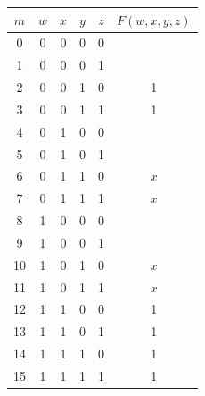 \begin{center}
\begin{tabular}{c|cccc|c}
\rowcolor[HTML]{FFCCC9} 
\cellcolor[HTML]{9AFF99}$m$ & $w$ & $x$ & $y$ & $z$ & \cellcolor[HTML]{FFFFC7}$F(w,x,y,z)$ \\ \hline
0                           & 0   & 0   & 0   & 0   &                                      \\
1                           & 0   & 0   & 0   & 1   &                                      \\
2                           & 0   & 0   & 1   & 0   & 1                                    \\
3                           & 0   & 0   & 1   & 1   & 1                                    \\
4                           & 0   & 1   & 0   & 0   &                                      \\
5                           & 0   & 1   & 0   & 1   &                                      \\
6                           & 0   & 1   & 1   & 0   & $x$                                  \\
7                           & 0   & 1   & 1   & 1   & $x$                                  \\
8                           & 1   & 0   & 0   & 0   &                                      \\
9                           & 1   & 0   & 0   & 1   &                                      \\
10                          & 1   & 0   & 1   & 0   & $x$                                  \\
11                          & 1   & 0   & 1   & 1   & $x$                                  \\
12                          & 1   & 1   & 0   & 0   & 1                                    \\
13                          & 1   & 1   & 0   & 1   & 1                                    \\
14                          & 1   & 1   & 1   & 0   & 1                                    \\
15                          & 1   & 1   & 1   & 1   & 1                                   
\end{tabular}
\end{center}
